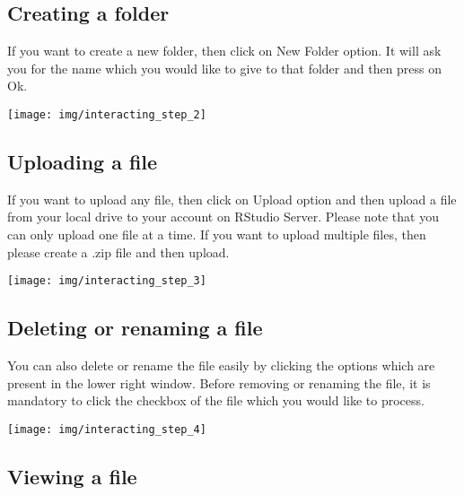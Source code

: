 \documentclass[
]{book}
\begin{document}
\hypertarget{creating-a-folder}{%
\subsection{Creating a folder}\label{creating-a-folder}}

If you want to create a new folder, then click on New Folder option. It will ask you for the name which you would like to give to that folder and then press on Ok.

\begin{center}\texttt{[image: img/interacting\_step\_2]} \end{center}

\hypertarget{uploading-a-file}{%
\subsection{Uploading a file}\label{uploading-a-file}}

If you want to upload any file, then click on Upload option and then upload a file from your local drive to your account on RStudio Server. Please note that you can only upload one file at a time. If you want to upload multiple files, then please create a .zip file and then upload.

\begin{center}\texttt{[image: img/interacting\_step\_3]} \end{center}

\hypertarget{deleting-or-renaming-a-file}{%
\subsection{Deleting or renaming a file}\label{deleting-or-renaming-a-file}}

You can also delete or rename the file easily by clicking the options which are present in the lower right window. Before removing or renaming the file, it is mandatory to click the checkbox of the file which you would like to process.

\begin{center}\texttt{[image: img/interacting\_step\_4]} \end{center}

\hypertarget{viewing-a-file}{%
\subsection{Viewing a file}\label{viewing-a-file}}
\end{document}
